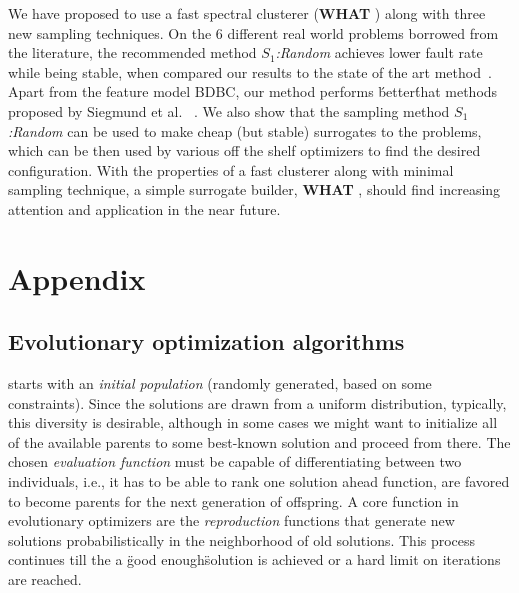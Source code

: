 \documentclass{sig-alternative}
\newcommand{\what}{{\bf WHAT }}
\begin{document}
We have proposed to use a fast spectral clusterer (\what) along with three new sampling techniques. On the 6 different real world problems borrowed from the literature, the recommended method \textit{$S_1$:Random} achieves lower fault rate while being stable, when compared our results to the state of the art method~\cite{siegmund2012predicting}. 
Apart from the feature model BDBC, our method performs \'better\' that methods proposed by Siegmund et al.  ~\cite{siegmund2012predicting}. We also show that the sampling method \textit{$S_1$:Random} can be used to make cheap (but stable) surrogates to the problems, which can be then used by various off the shelf optimizers to find the desired configuration. 
With the properties of  a fast clusterer along with minimal sampling technique, a simple surrogate builder, \what, should find increasing attention and application in the near future.



\vspace*{0.5mm}
 
 


\balance
  

\section{Appendix}

\subsection{Evolutionary optimization algorithms} \label{ssec:appendix_1}
starts with an \textit{initial population} (randomly generated, based on some constraints). Since the solutions are drawn from a uniform distribution, typically, this diversity is desirable, although in some cases we might want to initialize all of the available parents to some best-known solution and proceed from there. The chosen \textit{evaluation function} must be capable of differentiating
between two individuals, i.e., it has to be able to rank one solution ahead
function, are favored to become parents for the next generation of offspring. 
A core function in evolutionary optimizers are the
\textit{reproduction} functions that generate   new solutions  probabilistically in the neighborhood of old solutions. This process continues till the a \"good enough\" solution is achieved or a hard limit on iterations are reached.  
    
\end{document}
